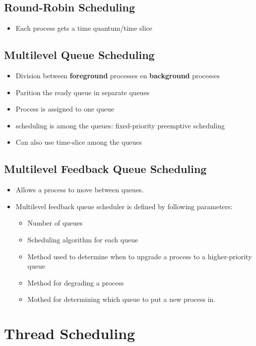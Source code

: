 \documentclass[10pt]{report}
\begin{document}
		\subsection{Round-Robin Scheduling}
			\begin{itemize}
				\item Each process gets a time quantum/time slice
			\end{itemize}

		\subsection{Multilevel Queue Scheduling}
			\begin{itemize}
				\item Division between \textbf{foreground} processes en \textbf{background} processes
				\item Parition the ready queue in separate queues
				\item Process is assigned to one queue
				\item scheduling is among the queues: fixed-priority preemptive scheduling
				\item Can also use time-slice among the queues
			\end{itemize}

		\subsection{Multilevel Feedback Queue Scheduling}
			\begin{itemize}
				\item Allows a process to move between queues.
				\item Multilevel feedback queue scheduler is defined by following parameters:
				\begin{itemize}
					\item Number of queues
					\item Scheduling algorithm for each queue
					\item Method used to determine when to upgrade a process to a higher-priority queue
					\item Method for degrading a process
					\item Mothed for determining which queue to put a new process in.
				\end{itemize}
			\end{itemize}


	\section{Thread Scheduling}
\end{document}
